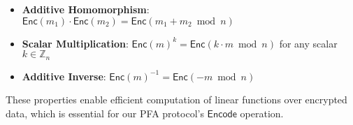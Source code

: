 \begin{itemize}
    \item \textbf{Additive Homomorphism}: $\mathsf{Enc}(m_1) \cdot \mathsf{Enc}(m_2) = \mathsf{Enc}(m_1 + m_2 \bmod n)$
    \item \textbf{Scalar Multiplication}: $\mathsf{Enc}(m)^k = \mathsf{Enc}(k \cdot m \bmod n)$ for any scalar $k \in \mathbb{Z}_n$
    \item \textbf{Additive Inverse}: $\mathsf{Enc}(m)^{-1} = \mathsf{Enc}(-m \bmod n)$
\end{itemize}

These properties enable efficient computation of linear functions over encrypted data, which is essential for our PFA protocol's $\mathsf{Encode}$ operation.




